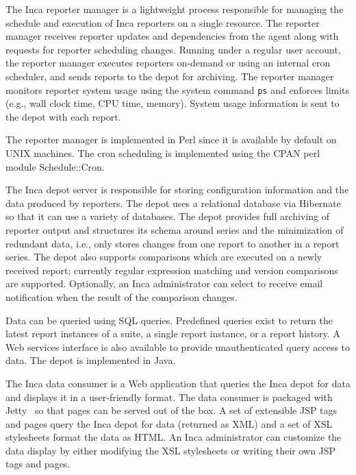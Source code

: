 \documentclass[times,10pt,twocolumn]{article}
\begin{document}


The Inca reporter manager is a lightweight process responsible for managing
the schedule and execution of Inca reporters on a single resource. The
reporter manager receives reporter updates and dependencies from the agent
along with requests for reporter scheduling changes.  Running under a regular
user account, the reporter manager executes reporters on-demand or using an
internal cron scheduler, and sends reports to the depot for archiving. The
reporter manager monitors reporter system usage using the system command
\texttt{ps} and enforces limits (e.g., wall clock time, CPU time, memory).
System usage information is sent to the depot with each report. 

The reporter manager is implemented in Perl since it is available by default
on UNIX machines.  The cron scheduling is implemented using the CPAN perl
module Schedule::Cron.  


The Inca depot server is responsible for storing configuration information and
the data produced by reporters. The depot uses a relational database via
Hibernate~\cite{hibernate} so that it can use a variety of databases.  The
depot provides full archiving of reporter output and structures its schema
around series and the minimization of redundant data, i.e., only stores
changes from one report to another in a report series.  The depot also
supports comparisons which are executed on a newly received report; 
currently regular expression matching and version comparisons are 
supported.  Optionally, an Inca administrator can select to receive
email notification when the result of the comparison changes.

Data can be queried using SQL queries. Predefined queries exist to return the
latest report instances of a suite, a single report instance, or a report
history.  A Web services interface is also available to provide
unauthenticated query access to data.  The depot is implemented in Java.


The Inca data consumer is a Web application that queries the Inca depot for
data and displays it in a user-friendly format.  The data consumer is packaged
with Jetty~\cite{jetty} so that pages can be served out of the box.  A set of
extensible JSP tags and pages query the Inca depot for data (returned as XML)
and a set of XSL stylesheets format the data as HTML.  An Inca administrator
can customize the data display by either modifying the XSL stylesheets or
writing their own JSP tags and pages.
\end{document}
